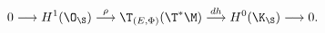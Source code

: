 \begin{equation}\label{ex1}
0\longrightarrow H^1(\O_{\S})\stackrel{\rho}\longrightarrow\T_{(E,\Phi)}(\T^*\M)
\stackrel{dh}\longrightarrow H^0(\K_{\S})\longrightarrow 0.
\end{equation}

